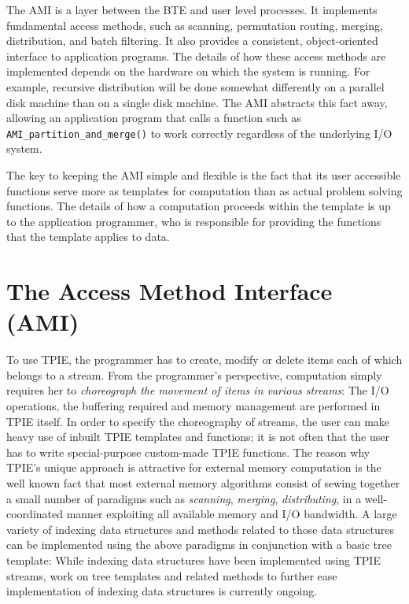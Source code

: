 The AMI is a layer between the BTE and
user level processes.  It implements fundamental access methods, such
as scanning, permutation routing, merging, distribution, and batch
filtering. It also provides a consistent, object-oriented interface to
application programs.  The details of how these access methods are
implemented depends on the hardware on which the system is running.
For example, recursive distribution will be done somewhat differently
on a parallel disk machine than on a single disk machine.  The AMI
abstracts this fact away, allowing an application program that calls a
function such as
\verb|AMI_partition_and_merge()| to work correctly
regardless of the underlying I/O system.

The key to keeping the AMI simple and flexible is the fact that its
user accessible functions serve more as templates for computation than
as actual problem solving functions.  The details of how a computation
proceeds within the template is up to the application programmer, who
is responsible for providing the functions that the template applies
to data.

\section{The Access Method Interface (AMI)}
\label{sec:ref-ami}
To use TPIE, the programmer has to create, modify or delete items each of
which belongs to a stream. From the programmer's perspective,
computation simply requires her to \emph{choreograph the movement of
items in various streams}: The I/O operations, the buffering required
and memory management are performed in TPIE itself. In order to specify
the choreography of streams, the user can make heavy use of inbuilt
TPIE templates and functions; it is not often that the user has to write
special-purpose custom-made TPIE functions. The reason why TPIE's unique
approach is attractive for external memory computation is the well
known fact that most external memory algorithms consist of sewing
together a small number of paradigms such as \emph{scanning},
\emph{merging}, \emph{distributing}, in a well-coordinated manner
exploiting all available memory and I/O bandwidth. A large variety of 
indexing data structures and methods related to those data structures 
can be implemented using the above paradigms in conjunction with a 
basic tree template: While indexing data structures have been
implemented using TPIE streams, work on tree templates and related
methods to further ease implementation of indexing data structures is
currently ongoing.

